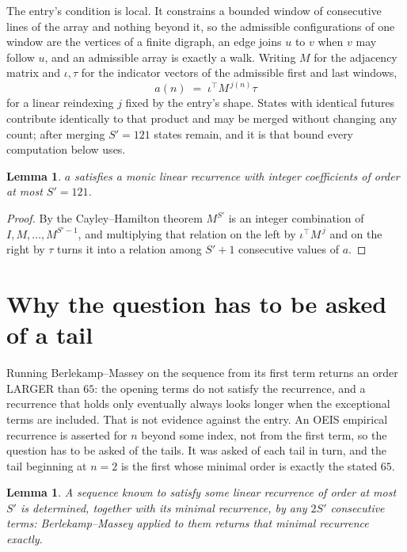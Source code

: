 \documentclass[11pt,a4paper]{article}
\theoremstyle{plain}
\newtheorem{lemma}[theorem]{Lemma}
\theoremstyle{definition}
\begin{document}
The entry's condition is local. It constrains a bounded window of consecutive lines of the
array and nothing beyond it, so the admissible configurations of one window are the vertices of
a finite digraph, an edge joins $u$ to $v$ when $v$ may follow $u$, and an admissible array is
exactly a walk. Writing $M$ for the adjacency matrix and $\iota,\tau$ for the indicator vectors
of the admissible first and last windows,
\[
a(n)\;=\;\iota^{\!\top}M^{\,j(n)}\tau
\]
for a linear reindexing $j$ fixed by the entry's shape. States with identical futures
contribute identically to that product and may be merged without changing any count; after
merging $S'=121$ states remain, and it is that bound every computation below uses.

\begin{lemma}\label{lem:cf}
$a$ satisfies a monic linear recurrence with integer coefficients of order at most $S'=121$.
\end{lemma}

\begin{proof}
By the Cayley--Hamilton theorem $M^{S'}$ is an integer combination of $I,M,\dots,M^{S'-1}$,
and multiplying that relation on the left by $\iota^{\!\top}M^{\,j}$ and on the right by
$\tau$ turns it into a relation among $S'+1$ consecutive values of $a$.
\end{proof}

\section{Why the question has to be asked of a tail}

Running Berlekamp--Massey on the sequence from its first term returns an order LARGER than $65$: the opening terms do not satisfy the recurrence, and a recurrence that holds only eventually always looks longer when the exceptional terms are included. That is not evidence against the entry. An OEIS empirical recurrence is asserted for $n$ beyond some index, not from the first term, so the question has to be asked of the tails. It was asked of each tail in turn, and the tail beginning at $n=2$ is the first whose minimal order is exactly the stated $65$.

\begin{lemma}\label{lem:bm}
A sequence known to satisfy some linear recurrence of order at most $S'$ is determined,
together with its minimal recurrence, by any $2S'$ consecutive terms: Berlekamp--Massey applied
to them returns that minimal recurrence exactly.
\end{lemma}
\end{document}
